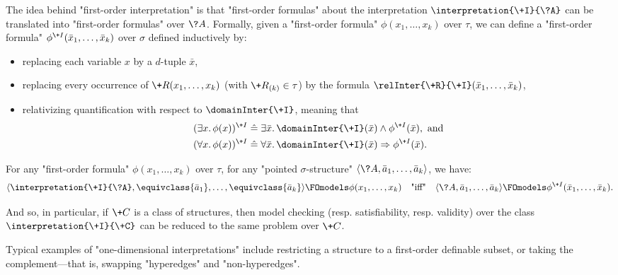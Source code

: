 The idea behind "first-order interpretation" is that
"first-order formulas" about the interpretation $\interpretation{\+I}{\?A}$
can be translated into "first-order formulas" over $\?A$.
Formally, given a "first-order formula" $\phi(x_1,\dotsc,x_k)$ over $\tau$,
we can define a "first-order formula" $\phi^{\+I}(\bar x_1,\dotsc,\bar x_k)$ over $\sigma$
defined inductively by:
\begin{itemize}
	\item replacing each variable $x$ by a $d$-tuple $\bar x$,
	\item replacing every occurrence of
		$\+R(x_1,\dotsc, x_k)$ (with $\+R_{(k)} \in \tau$)
		by the formula $\relInter{\+R}{\+I}(\bar x_1, \dotsc, \bar x_k)$,
	\item relativizing quantification with respect to $\domainInter{\+I}$,
		meaning that
		\begin{align*}
			(\exists x.\, \phi(x))^{\+I} 
			& \defeq \exists \bar x.\, \domainInter{\+I}(\bar x) \land \phi^{\+I}(\bar x),
			\text{ and} \\ 
			(\forall x.\, \phi(x))^{\+I} 
			& \defeq \forall \bar x.\, \domainInter{\+I}(\bar x) \Rightarrow \phi^{\+I}(\bar x).
		\end{align*}
\end{itemize} 
\begin{proposition}
	\AP\label{prop:first-order-interpretation}
	For any "first-order formula" $\phi(x_1,\dotsc,x_k)$ over $\tau$,
	for any "pointed $\sigma$-structure" $\tup{\?A, \bar a_1,\dotsc, \bar a_k}$, we have:
	\[
		\tup{\interpretation{\+I}{\?A}, \equivclass{\bar a_1}, \dotsc, \equivclass{\bar a_k}}
		\FOmodels \phi(x_1, \dotsc, x_k)
		\quad\text{"iff"}\quad
		\tup{\?A, \bar a_1,\dotsc, \bar a_k} \FOmodels \phi^{\+I}(\bar x_1,\dotsc,\bar x_k).
	\]
\end{proposition}
And so, in particular, if $\+C$ is a class of structures, then
model checking (resp. satisfiability, resp. validity) over the class $\interpretation{\+I}{\+C}$
can be reduced to the same problem over $\+C$.

Typical examples of "one-dimensional interpretations" include
restricting a structure to a first-order definable subset, 
or taking the complement---that is, swapping "hyperedges" and "non-hyperedges".

